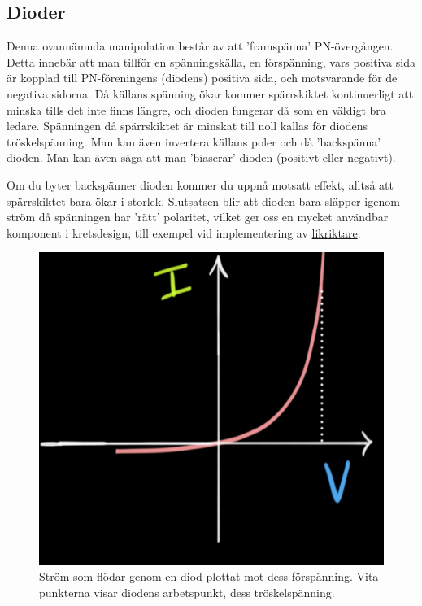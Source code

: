 \subsection{Dioder}
Denna ovannämnda manipulation består av att 'framspänna' PN-övergången. Detta innebär att man tillför en spänningskälla, en förspänning, vars positiva sida är kopplad till PN-föreningens (diodens) positiva sida, och motsvarande för de negativa sidorna. Då källans spänning ökar kommer spärrskiktet kontinuerligt att minska tills det inte finns längre, och dioden fungerar då som en väldigt bra ledare. Spänningen då spärrskiktet är minskat till noll kallas för diodens tröskelspänning. Man kan även invertera källans poler och då 'backspänna' dioden. Man kan även säga att man 'biaserar' dioden (positivt eller negativt).

Om du byter backspänner dioden kommer du uppnå motsatt effekt, alltså att spärrskiktet bara ökar i storlek. Slutsatsen blir att dioden bara släpper igenom ström då spänningen har 'rätt' polaritet, vilket ger oss en mycket användbar komponent i kretsdesign, till exempel vid implementering av \href{https://sv.wikipedia.org/wiki/Likriktning}{likriktare}.

\begin{figure}[ht]
    \centering
    \includegraphics[scale = 0.3]{bilder/fig: arbetspunkt.png}
    \caption{Ström som flödar genom en diod plottat mot dess förspänning. Vita punkterna visar diodens arbetspunkt, dess tröskelspänning.}
    \label{fig:arbetspunkt}
\end{figure}

